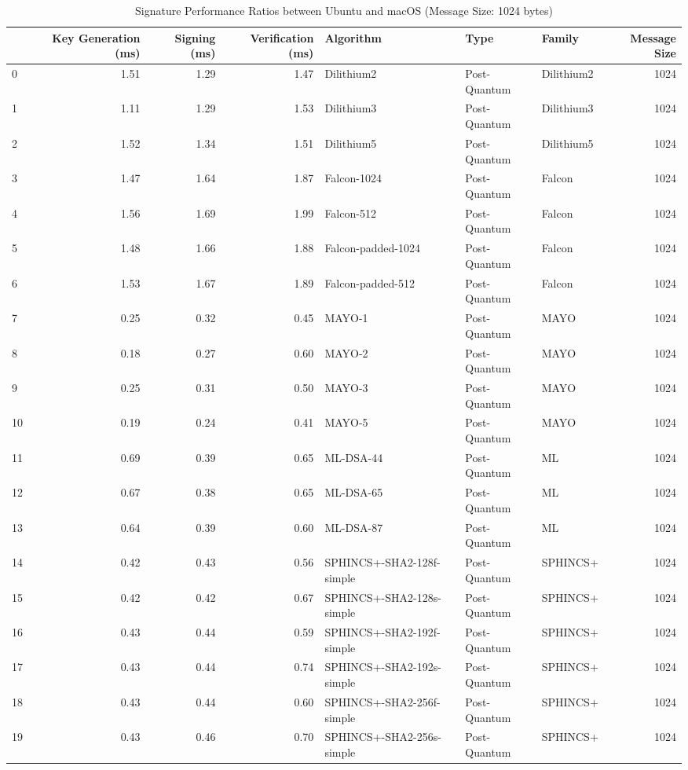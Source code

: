 \begin{table}
\caption{Signature Performance Ratios between Ubuntu and macOS (Message Size: 1024 bytes)}
\label{tab:desktop_sig_ratio_1024}
\begin{tabular}{lrrrlllr}
\toprule
 & Key Generation (ms) & Signing (ms) & Verification (ms) & Algorithm & Type & Family & Message Size \\
\midrule
0 & 1.51 & 1.29 & 1.47 & Dilithium2 & Post-Quantum & Dilithium2 & 1024 \\
1 & 1.11 & 1.29 & 1.53 & Dilithium3 & Post-Quantum & Dilithium3 & 1024 \\
2 & 1.52 & 1.34 & 1.51 & Dilithium5 & Post-Quantum & Dilithium5 & 1024 \\
3 & 1.47 & 1.64 & 1.87 & Falcon-1024 & Post-Quantum & Falcon & 1024 \\
4 & 1.56 & 1.69 & 1.99 & Falcon-512 & Post-Quantum & Falcon & 1024 \\
5 & 1.48 & 1.66 & 1.88 & Falcon-padded-1024 & Post-Quantum & Falcon & 1024 \\
6 & 1.53 & 1.67 & 1.89 & Falcon-padded-512 & Post-Quantum & Falcon & 1024 \\
7 & 0.25 & 0.32 & 0.45 & MAYO-1 & Post-Quantum & MAYO & 1024 \\
8 & 0.18 & 0.27 & 0.60 & MAYO-2 & Post-Quantum & MAYO & 1024 \\
9 & 0.25 & 0.31 & 0.50 & MAYO-3 & Post-Quantum & MAYO & 1024 \\
10 & 0.19 & 0.24 & 0.41 & MAYO-5 & Post-Quantum & MAYO & 1024 \\
11 & 0.69 & 0.39 & 0.65 & ML-DSA-44 & Post-Quantum & ML & 1024 \\
12 & 0.67 & 0.38 & 0.65 & ML-DSA-65 & Post-Quantum & ML & 1024 \\
13 & 0.64 & 0.39 & 0.60 & ML-DSA-87 & Post-Quantum & ML & 1024 \\
14 & 0.42 & 0.43 & 0.56 & SPHINCS+-SHA2-128f-simple & Post-Quantum & SPHINCS+ & 1024 \\
15 & 0.42 & 0.42 & 0.67 & SPHINCS+-SHA2-128s-simple & Post-Quantum & SPHINCS+ & 1024 \\
16 & 0.43 & 0.44 & 0.59 & SPHINCS+-SHA2-192f-simple & Post-Quantum & SPHINCS+ & 1024 \\
17 & 0.43 & 0.44 & 0.74 & SPHINCS+-SHA2-192s-simple & Post-Quantum & SPHINCS+ & 1024 \\
18 & 0.43 & 0.44 & 0.60 & SPHINCS+-SHA2-256f-simple & Post-Quantum & SPHINCS+ & 1024 \\
19 & 0.43 & 0.46 & 0.70 & SPHINCS+-SHA2-256s-simple & Post-Quantum & SPHINCS+ & 1024 \\

\end{tabular}
\end{table}
